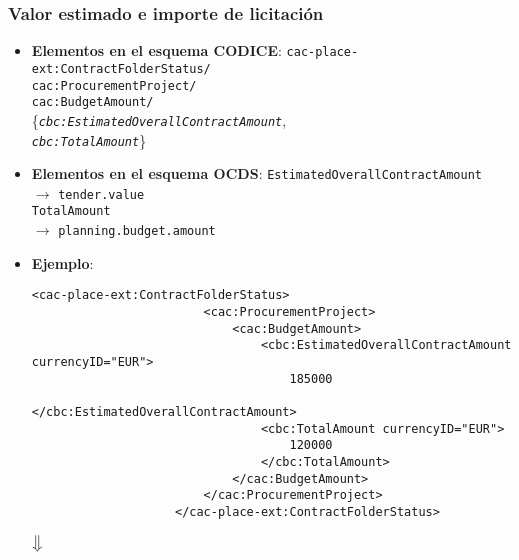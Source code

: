        \subsubsection{Valor estimado e importe de licitación}
        \begin{itemize}
            \item \textbf{Elementos en el esquema CODICE}:
                \tabto{7.7cm} \texttt{cac-place-ext:ContractFolderStatus/} \\
                \tabto{7.7cm} \texttt{cac:ProcurementProject/} \\
                \tabto{7.7cm} \texttt{cac:BudgetAmount/} \\
                \tabto{7.7cm} \{\texttt{\textit{cbc:EstimatedOverallContractAmount}}, \\
                \tabto{7.7cm} \texttt{\textit{cbc:TotalAmount}}\}
            \item \textbf{Elementos en el esquema OCDS}:
                \tabto{7.7cm} \texttt{EstimatedOverallContractAmount} \\ \tabto{8cm} $\rightarrow$ \texttt{tender.value} \\
                \tabto{7.7cm} \texttt{TotalAmount} \\ \tabto{8cm} $\rightarrow$ \texttt{planning.budget.amount}
            \item \textbf{Ejemplo}: \\
                \begin{lstlisting}[language=lXML]
                    <cac-place-ext:ContractFolderStatus>
                        <cac:ProcurementProject>
                            <cac:BudgetAmount>
                                <cbc:EstimatedOverallContractAmount currencyID="EUR">
                                    185000
                                </cbc:EstimatedOverallContractAmount>
                                <cbc:TotalAmount currencyID="EUR">
                                    120000
                                </cbc:TotalAmount>
                            </cac:BudgetAmount>
                        </cac:ProcurementProject>
                    </cac-place-ext:ContractFolderStatus>
                \end{lstlisting}
                
                \begin{center}
                    $\big\Downarrow$
                \end{center}
                

\end{itemize}
